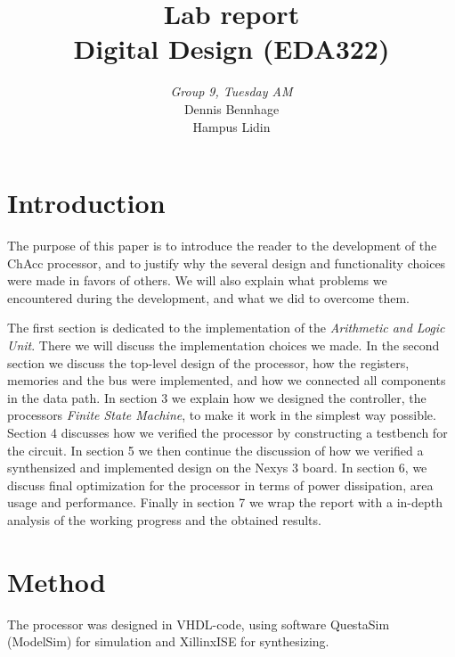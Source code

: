 \documentclass[a4,11pt]{article}
\begin{document}
\pagestyle{empty}
\begin{titlepage}

	\title{\Huge{Lab report} \\[0.1cm] \Large{Digital Design (EDA322)} \\[0.4cm]}
	\author{\large{\emph{Group 9, Tuesday AM}} \\[0.2cm] Dennis Bennhage \\[0.05cm] Hampus Lidin \\[0.1cm]}
	\maketitle
	\thispagestyle{empty}
\end{titlepage}
\clearpage
\pagestyle{fancyplain}
\tableofcontents
\clearpage
\setcounter{page}{1}
\section{Introduction}

The purpose of this paper is to introduce the reader to the development of the
ChAcc processor, and to justify why the several design and functionality
choices were made in favors of others. We will also explain what
problems we encountered during the development, and what we did to overcome
them.

The first section is dedicated to the implementation of the {\it Arithmetic and
Logic Unit}. There we will discuss the implementation choices we made. In the
second section we discuss the top-level design of the processor, how the
registers, memories and the bus were implemented, and how we connected all
components in the data path. In section 3 we explain how we designed the
controller, the processors {\it Finite State Machine}, to make it work in the
simplest way possible. Section 4 discusses how we verified the processor by
constructing a testbench for the circuit. In section 5 we then continue the
discussion of how we verified a synthensized and implemented design on the
Nexys 3 board. In section 6, we discuss final optimization for the processor in
terms of power dissipation, area usage and performance. Finally in section 7 we
wrap the report with a in-depth analysis of the working progress and the
obtained results. 

\section{Method}
The processor was designed in VHDL-code, using software QuestaSim (ModelSim) for simulation and
XillinxISE for synthesizing. 
\end{document}
